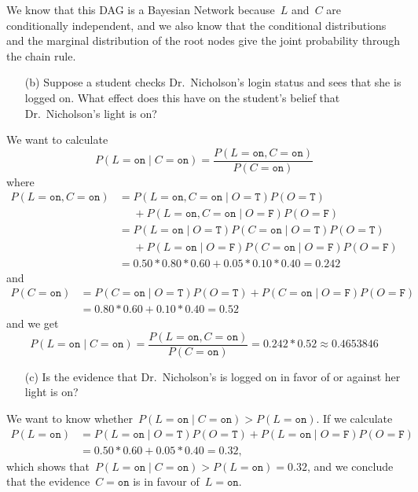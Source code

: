 \documentclass[a4paper]{article}
\newcommand{\T}{\texttt{T}}
\newcommand{\F}{\texttt{F}}
\newcommand{\on}{\texttt{on}}
\begin{document}
We know that this DAG is a Bayesian Network because~\(L\) and~\(C\) are
conditionally independent, and we also know that the conditional distributions
and the marginal distribution of the root nodes give the joint probability
through the chain rule.

\begin{enumerate}
    \item[(b)] Suppose a student checks Dr.\ Nicholson's login status and sees
        that she is logged on. What effect does this have on the student's
        belief that Dr.\ Nicholson's light is on?
\end{enumerate}

We want to calculate
\[
    P(L = \on \mid C = \on) = \frac{P(L = \on, C = \on)}{P(C = \on)}
\]
where
\begin{align*}
    P(L = \on, C = \on) &= P(L = \on, C = \on \mid O = \T)P(O = \T) \\
                        &\phantom{=}+ P(L = \on, C = \on \mid O = \F)P(O = \F) \\
                        &= P(L = \on \mid O = \T)P(C = \on \mid O = \T)P(O = \T) \\
                        &\phantom{=}+ P(L = \on \mid O = \F)P(C = \on \mid O = \F)P(O = \F) \\
                        &= 0.50 * 0.80 * 0.60 + 0.05 * 0.10 * 0.40 = 0.242
\end{align*}
and
\begin{align*}
    P(C = \on) &= P(C = \on \mid O = \T)P(O = \T) + P(C = \on \mid O = \F)P(O = \F) \\
               &= 0.80 * 0.60 + 0.10 * 0.40 = 0.52
\end{align*}
and we get
\[
    P(L = \on \mid C = \on) = \frac{P(L = \on, C = \on)}{P(C = \on)} = 0.242 * 0.52 \approx 0.4653846
\]

\begin{enumerate}
    \item[(c)] Is the evidence that Dr.\ Nicholson's is logged on in favor of or
        against her light is on?
\end{enumerate}

We want to know whether~\(P(L = \on \mid C = \on) > P(L = \on)\). If we
calculate
\begin{align*}
    P(L = \on) &= P(L = \on \mid O = \T)P(O = \T) + P(L = \on \mid O = \F)P(O = \F) \\
               &= 0.50 * 0.60 + 0.05 * 0.40 = 0.32,
\end{align*}
which shows that~\(P(L = \on \mid C = \on) > P(L = \on) = 0.32\), and we
conclude that the evidence~\(C = \on\) is in favour of~\(L = \on\).
\end{document}
